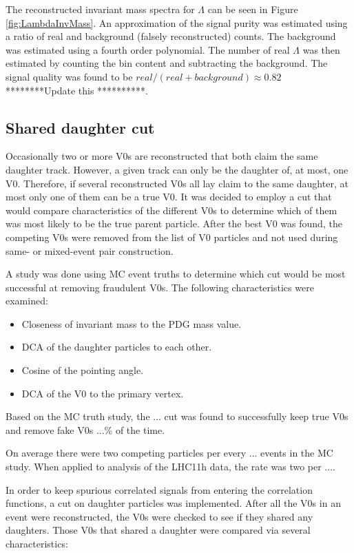 The reconstructed invariant mass spectra for $\Lambda$ can be seen in Figure \ref{fig:LambdaInvMass}. An approximation of the signal purity was estimated using a ratio of real and background (falsely reconstructed) counts.  The background was estimated using a fourth order polynomial.  The number of real $\Lambda$ was then estimated by counting the bin content and subtracting the background. The signal quality was found to be $real/(real + background) \approx 0.82$ ********Update this **********.


\subsection{Shared daughter cut}

Occasionally two or more V0s are reconstructed that both claim the same daughter track.  However, a given track can only be the daughter of, at most, one V0.  Therefore, if several reconstructed V0s all lay claim to the same daughter, at most only one of them can be a true V0.  It was decided to employ a cut that would compare characteristics of the different V0s to determine which of them was most likely to be the true parent particle.  After the best V0 was found, the competing V0s were removed from the list of V0 particles and not used during same- or mixed-event pair construction.

A study was done using MC event truths to determine which cut would be most successful at removing fraudulent V0s.  The following characteristics were examined:

\begin{itemize}
\item Closeness of invariant mass to the PDG mass value.
\item DCA of the daughter particles to each other.
\item Cosine of the pointing angle.
\item DCA of the V0 to the primary vertex.
\end{itemize}

Based on the MC truth study, the ... cut was found to successfully keep true V0s and remove fake V0s ...\% of the time.  

On average there were two competing particles per every ... events in the MC study.  When applied to analysis of the LHC11h data, the rate was two per ....

In order to keep spurious correlated signals from entering the correlation functions, a cut on daughter particles was implemented.  After all the V0s in an event were reconstructed, the V0s were checked to see if they shared any daughters.  Those V0s that shared a daughter were compared via several characteristics:

